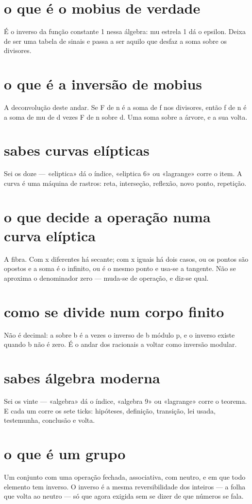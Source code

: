 \documentclass[11pt,a4paper]{article}
\begin{document}
\section{o que é o mobius de verdade}
É o inverso da função constante 1 nessa álgebra: mu estrela 1 dá o epsilon. Deixa de ser
uma tabela de sinais e passa a ser aquilo que desfaz a soma sobre os divisores.

\section{o que é a inversão de mobius}
A deconvolução deste andar. Se F de n é a soma de f nos divisores, então f de n é a soma
de mu de d vezes F de n sobre d. Uma soma sobre a árvore, e a sua volta.

\section{sabes curvas elípticas}
Sei os doze --- «eliptica» dá o índice, «eliptica 6» ou «lagrange» corre o item. A curva
é uma máquina de rastros: reta, interseção, reflexão, novo ponto, repetição.

\section{o que decide a operação numa curva elíptica}
A fibra. Com x diferentes há secante; com x iguais há dois casos, ou os pontos são
opostos e a soma é o infinito, ou é o mesmo ponto e usa-se a tangente. Não se aproxima o
denominador zero --- muda-se de operação, e diz-se qual.

\section{como se divide num corpo finito}
Não é decimal: a sobre b é a vezes o inverso de b módulo p, e o inverso existe quando b
não é zero. É o andar dos racionais a voltar como inversão modular.

\section{sabes álgebra moderna}
Sei os vinte --- «algebra» dá o índice, «algebra 9» ou «lagrange» corre o teorema. E cada
um corre os sete ticks: hipóteses, definição, transição, lei usada, testemunha, conclusão
e volta.

\section{o que é um grupo}
Um conjunto com uma operação fechada, associativa, com neutro, e em que todo elemento tem
inverso. O inverso é a mesma reversibilidade dos inteiros --- a folha que volta ao neutro
--- só que agora exigida sem se dizer de que números se fala.
\end{document}
